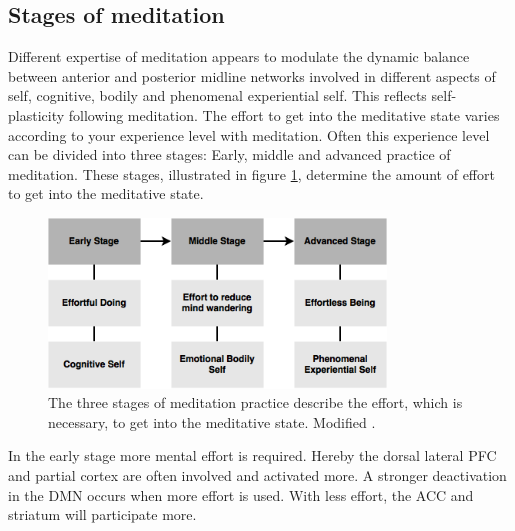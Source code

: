 \subsection{Stages of meditation}
Different expertise of meditation appears to modulate the dynamic balance between anterior and posterior midline networks involved in different aspects of self, cognitive, bodily and phenomenal experiential self. This reflects self-plasticity following meditation. 
The effort to get into the meditative state varies according to your experience level with meditation. Often this experience level can be divided into three stages: Early, middle and advanced practice of meditation. These stages, illustrated in figure \ref{fig:meditation_stages}, determine the amount of effort to get into the meditative state. \cite{Tang2017} 

\begin{figure}[H]
\includegraphics[width=0.8\textwidth]{figures/stages_of_meditation.png} 
	\caption{The three stages of meditation practice describe the effort, which is necessary, to get into the meditative state. Modified \cite{Tang2017}.}
	\label{fig:meditation_stages}  
\end{figure}  

In the early stage more mental effort is required. Hereby the dorsal lateral PFC and partial cortex are often involved and activated more. A stronger deactivation in the DMN occurs when more effort is used. With less effort, the ACC and striatum will participate more. \cite{Tang2017}


